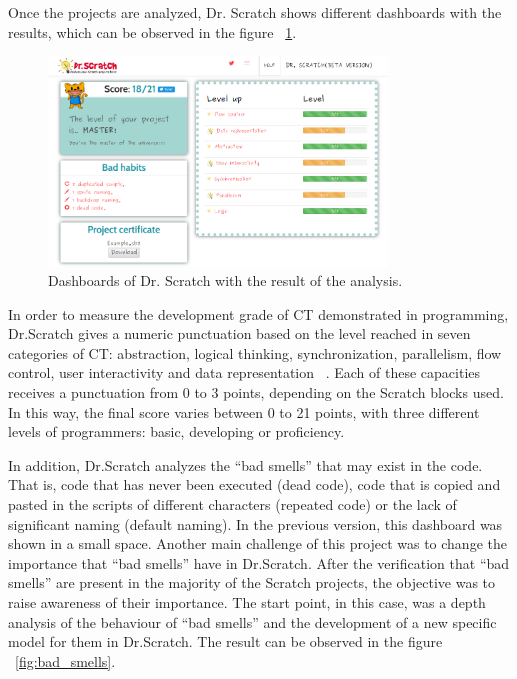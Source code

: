 Once the projects are analyzed, Dr. Scratch shows different dashboards with the results, which can be observed in the figure ~\ref{fig:dashboards}.

\begin{figure}[h]
  \centering
  \includegraphics[width=9cm, keepaspectratio]{img/dashboards.png}
  \caption{Dashboards of Dr. Scratch with the result of the analysis.}
  \label{fig:dashboards}
\end{figure}

In order to measure the development grade of CT demonstrated in programming, Dr.Scratch gives a numeric punctuation based on the level reached in seven categories of CT: abstraction, logical thinking, synchronization, parallelism, flow control, user interactivity and data representation ~\cite{jesus:_drscratch}. Each of these capacities receives a punctuation from 0 to 3 points, depending on the Scratch blocks used. In this way, the final score varies between 0 to 21 points, with three different levels of programmers: basic, developing or proficiency.   

In addition, Dr.Scratch analyzes the ``bad smells'' that may exist in the code. That is, code that has never been executed (dead code), code that is copied and pasted in the scripts of different characters (repeated code) or the lack of significant naming (default naming). In the previous version, this dashboard was shown in a small space. Another main challenge of this project was to change the importance that ``bad smells'' have in Dr.Scratch. After the verification that ``bad smells'' are present in the majority of the Scratch projects, the objective was to raise awareness of their importance. The start point, in this case, was a depth analysis of the behaviour of ``bad smells'' and the development of a new specific model for them in Dr.Scratch. The result can be observed in the figure ~\ref{fig:bad_smells}.

